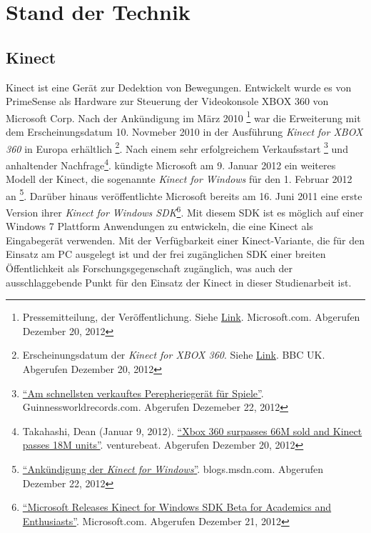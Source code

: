 \chapter{Stand der Technik}
\label{chap:Stand der Technik}

\section{Kinect}
Kinect ist eine Ger\"at zur Dedektion von Bewegungen. Entwickelt wurde es von PrimeSense als Hardware zur Steuerung der Videokonsole 
XBOX 360 von Microsoft Corp. Nach der Ank\"undigung im M\"arz 2010 \footnote{Pressemitteilung, der Ver\"offentlichung. Siehe \href{https://www.microsoft.com/en-us/news/press/2010/mar10/03-31PrimeSensePR.aspx}{Link}. Microsoft.com.  Abgerufen Dezember 20, 2012}
war die Erweiterung mit dem Erscheinungsdatum 10. Novmeber 2010 in der Ausf\"uhrung \textit{Kinect for XBOX 360} in Europa erh\"altlich \footnote{Erscheinungsdatum der \textit{Kinect for XBOX 360}. Siehe \href{http://www.bbc.co.uk/newsbeat/10996389}{Link}. BBC UK. Abgerufen Dezember 20, 2012}.
Nach einem sehr erfolgreichem Verkaufsstart \footnote{\href{http://www.guinnessworldrecords.com/records-9000/fastest-selling-gaming-peripheral/}{\enquote{Am schnellsten verkauftes Perepherieger\"at f\"ur Spiele}}. Guinnessworldrecords.com. Abgerufen Dezemeber 22, 2012}
und anhaltender Nachfrage\footnote{Takahashi, Dean (Januar 9, 2012). \href{http://venturebeat.com/2012/01/09/xbox-360-surpassed-66m-sold-and-kinect-has-sold-18m-units/}{\enquote{Xbox 360 surpasses 66M sold and Kinect passes 18M units}}. venturebeat. Abgerufen Dezember 20, 2012}.
k\"undigte Microsoft am 9. Januar 2012 ein weiteres Modell der Kinect, die sogenannte \textit{Kinect for Windows} f\"ur den 1. Februar 2012 an \footnote{\href{https://blogs.msdn.com/b/kinectforwindows/archive/2012/01/09/kinect-for-windows-commercial-program-announced.aspx?Redirected=true}{\enquote{Ank\"undigung der \textit{Kinect for Windows}}}. blogs.msdn.com. Abgerufen Dezember 22, 2012}.
\newline
Dar\"uber hinaus ver\"offentlichte Microsoft bereits am 16. Juni 2011 eine erste Version ihrer \textit{Kinect for Windows SDK}\footnote{\href{https://www.microsoft.com/en-us/news/press/2011/jun11/06-16MSKinectSDKPR.aspx}{\enquote{Microsoft Releases Kinect for Windows SDK Beta for Academics and Enthusiasts}}. Microsoft.com. Abgerufen Dezember 21, 2012}.
Mit diesem \gls{SDK} ist es m\"oglich auf einer Windows 7 Plattform Anwendungen zu entwickeln, die eine Kinect als Eingabeger\"at verwenden.
\newline
Mit der Verf\"ugbarkeit einer Kinect-Variante, die f\"ur den Einsatz am PC ausgelegt ist und der frei zug\"anglichen \acrshort{SDK} einer breiten \"Offentlichkeit als Forschungsgegenschaft zug\"anglich, 
was auch der ausschlaggebende Punkt f\"ur den Einsatz der Kinect in dieser Studienarbeit ist.
